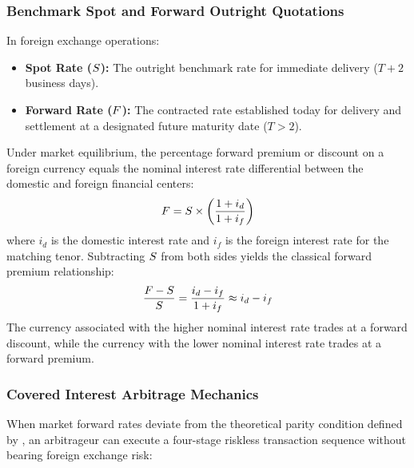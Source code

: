 \subsubsection{Benchmark Spot and Forward Outright Quotations}
In foreign exchange operations:
\begin{itemize}[leftmargin=*, noitemsep]
    \item \textbf{Spot Rate ($S$):} The outright benchmark rate for immediate delivery ($T+2$ business days).
    \item \textbf{Forward Rate ($F$):} The contracted rate established today for delivery and settlement at a designated future maturity date ($T > 2$).
\end{itemize}
Under market equilibrium, the percentage forward premium or discount on a foreign currency equals the nominal interest rate differential between the domestic and foreign financial centers:
\begin{equation}
    F = S \times \left( \frac{1 + i_d}{1 + i_f} \right)
\end{equation}
where $i_d$ is the domestic interest rate and $i_f$ is the foreign interest rate for the matching tenor. Subtracting $S$ from both sides yields the classical forward premium relationship:
\begin{equation}
    \frac{F - S}{S} = \frac{i_d - i_f}{1 + i_f} \approx i_d - i_f
\end{equation}
The currency associated with the higher nominal interest rate trades at a forward discount, while the currency with the lower nominal interest rate trades at a forward premium.

\subsubsection{Covered Interest Arbitrage Mechanics}
When market forward rates deviate from the theoretical parity condition defined by , an arbitrageur can execute a four-stage riskless transaction sequence without bearing foreign exchange risk:

